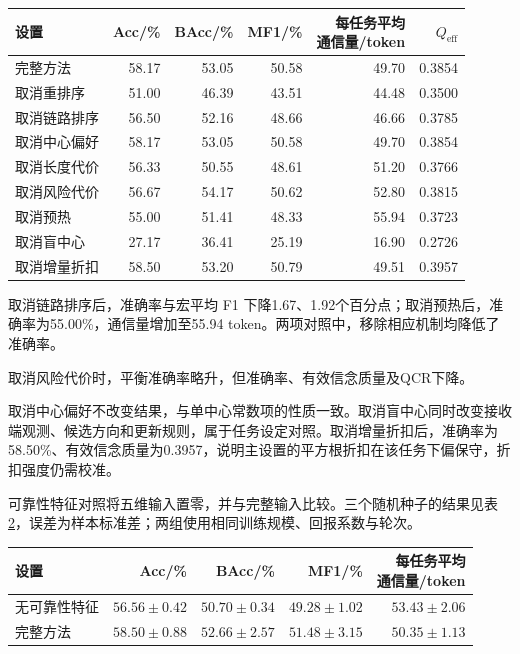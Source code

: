 \begin{table}[htbp]
\centering\small
{}
\label{rq2:tab:ablation}
\begin{tabular}{lrrrrr}
\toprule
设置 & Acc/\% & BAcc/\% & MF1/\% & \shortstack{每任务平均\\通信量/token} & $Q_{\mathrm{eff}}$\\
\midrule
完整方法 & 58.17 & 53.05 & 50.58 & 49.70 & 0.3854\\
取消重排序 & 51.00 & 46.39 & 43.51 & 44.48 & 0.3500\\
取消链路排序 & 56.50 & 52.16 & 48.66 & 46.66 & 0.3785\\
取消中心偏好 & 58.17 & 53.05 & 50.58 & 49.70 & 0.3854\\
取消长度代价 & 56.33 & 50.55 & 48.61 & 51.20 & 0.3766\\
取消风险代价 & 56.67 & 54.17 & 50.62 & 52.80 & 0.3815\\
取消预热 & 55.00 & 51.41 & 48.33 & 55.94 & 0.3723\\
取消盲中心 & 27.17 & 36.41 & 25.19 & 16.90 & 0.2726\\
取消增量折扣 & 58.50 & 53.20 & 50.79 & 49.51 & 0.3957\\
\bottomrule
\end{tabular}
\end{table}

取消链路排序后，准确率与宏平均 F1 下降1.67、1.92个百分点；取消预热后，准确率为55.00\%，通信量增加至55.94 token。两项对照中，移除相应机制均降低了准确率。

取消风险代价时，平衡准确率略升，但准确率、有效信念质量及QCR下降。

取消中心偏好不改变结果，与单中心常数项的性质一致。取消盲中心同时改变接收端观测、候选方向和更新规则，属于任务设定对照。取消增量折扣后，准确率为58.50\%、有效信念质量为0.3957，说明主设置的平方根折扣在该任务下偏保守，折扣强度仍需校准。

可靠性特征对照将五维输入置零，并与完整输入比较。三个随机种子的结果见表\ref{rq2:tab:reliability}，误差为样本标准差；两组使用相同训练规模、回报系数与轮次。

\begin{table}[htbp]
\centering\small
{}
\label{rq2:tab:reliability}
\begin{tabular}{lrrrr}
\toprule
设置 & Acc/\% & BAcc/\% & MF1/\% & \shortstack{每任务平均\\通信量/token}\\
\midrule
无可靠性特征 & $56.56\pm0.42$ & $50.70\pm0.34$ & $49.28\pm1.02$ & $53.43\pm2.06$\\
完整方法 & $58.50\pm0.88$ & $52.66\pm2.57$ & $51.48\pm3.15$ & $50.35\pm1.13$\\
\bottomrule
\end{tabular}
\end{table}

